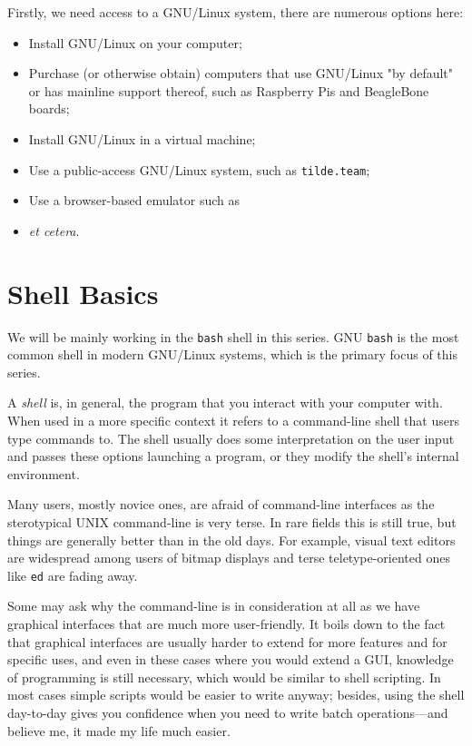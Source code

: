 \documentclass{extbook}
\begin{document}
Firstly, we need access to a GNU/Linux system, there are numerous options here:

\begin{itemize}
	\item Install GNU/Linux on your computer;
	\item Purchase (or otherwise obtain) computers that use GNU/Linux "by default" or has mainline support thereof, such as Raspberry Pis and BeagleBone boards;
	\item Install GNU/Linux in a virtual machine;
	\item Use a public-access GNU/Linux system, such as \texttt{tilde.team}; 
	\item Use a browser-based emulator such as 
	\item \textit{et cetera}.
\end{itemize}


\chapter{Shell Basics}

We will be mainly working in the \texttt{bash} shell in this series.  GNU \texttt{bash} is the most common shell in modern GNU/Linux systems, which is the primary focus of this series.

A \textit{shell} is, in general, the program that you interact with your computer with.  When used in a more specific context it refers to a command-line shell that users type commands to.  The shell usually does some interpretation on the user input and passes these options launching a program, or they modify the shell's internal environment.

Many users, mostly novice ones, are afraid of command-line interfaces as the sterotypical UNIX command-line is very terse.  In rare fields this is still true, but things are generally better than in the old days.  For example, visual text editors are widespread among users of bitmap displays and terse teletype-oriented ones like \texttt{ed} are fading away.

Some may ask why the command-line is in consideration at all as we have graphical interfaces that are much more user-friendly.  It boils down to the fact that graphical interfaces are usually harder to extend for more features and for specific uses, and even in these cases where you would extend a GUI, knowledge of programming is still necessary, which would be similar to shell scripting.  In most cases simple scripts would be easier to write anyway; besides, using the shell day-to-day gives you confidence when you need to write batch operations---and believe me, it made my life much easier.
\end{document}

